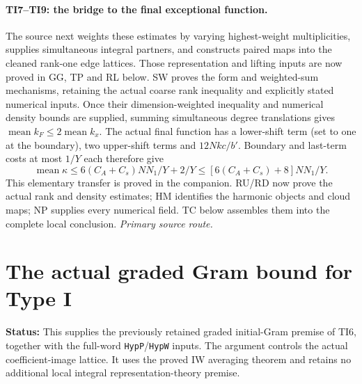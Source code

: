 \documentclass[11pt,a4paper]{article}
\numberwithin{equation}{section}
\theoremstyle{remark}\newtheorem{remark}[theorem]{Remark}
\newcommand{\status}[1]{\textbf{Status:} #1}
\begin{document}
\paragraph{TI7--TI9: the bridge to the final exceptional function.}
The source next weights these estimates by varying highest-weight
multiplicities, supplies simultaneous integral partners, and constructs
paired maps into the cleaned rank-one edge lattices.
Those representation and lifting inputs are now proved in GG, TP
and RL below. SW proves the form and weighted-sum mechanisms, retaining
the actual coarse rank inequality and explicitly stated numerical inputs.
Once their dimension-weighted inequality and numerical density bounds are
supplied, summing simultaneous degree translations gives
$\operatorname{mean}k_F\leq2\operatorname{mean}k_x$.
The actual final function has a lower-shift term (set to one at the boundary),
two upper-shift terms and $12Nkc/b'$.  Boundary and last-term costs at most
$1/Y$ each therefore give
\[
 \operatorname{mean}\kappa
 \leq6(C_A+C_s)NN_1/Y+2/Y
 \leq[6(C_A+C_s)+8]NN_1/Y.
 \tag{TI8.1}
\]
This elementary transfer is proved in the companion. RU/RD now
prove the actual rank and density estimates; HM identifies the harmonic
objects and cloud maps; NP supplies every numerical field. TC below
assembles them into the complete local conclusion.
\noindent\textit{Primary source route.}\cite{type-one-actual}


\section{The actual graded Gram bound for Type I}
\label{sec:graded-gram}

\status{This supplies the previously retained graded initial-Gram premise
of TI6, together with the full-word \texttt{HypP}/\texttt{HypW} inputs.
The argument controls the actual coefficient-image lattice.
It uses the proved IW averaging theorem and retains no additional local
integral representation-theory premise.}
\end{document}
